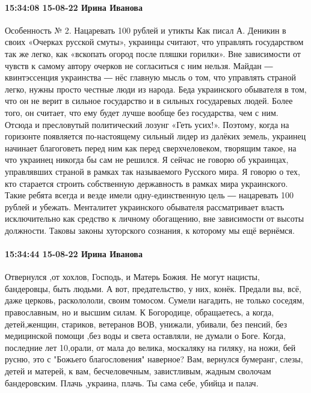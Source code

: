 \paragraph{15:34:08 15-08-22 Ирина Иванова}

Особенность № 2. Нацаревать 100 рублей и утикты Как писал А. Деникин в своих
«Очерках русской смуты», украинцы считают, что управлять государством так же
легко, как «вскопать огород после пляшки горилки». Вне зависимости от чувств к
самому автору очерков не согласиться с ним нельзя. Майдан ― квинтэссенция
украинства ― нёс главную мысль о том, что управлять страной легко, нужны просто
честные люди из народа. Беда украинского обывателя в том, что он не верит в
сильное государство и в сильных государевых людей. Более того, он считает, что
ему будет лучше вообще без государства, чем с ним. Отсюда и пресловутый
политический лозунг «Геть усих!». Поэтому, когда на горизонте появляется
по-настоящему сильный лидер из далёких земель, украинец начинает благоговеть
перед ним как перед сверхчеловеком, творящим такое, на что украинец никогда бы
сам не решился. Я сейчас не говорю об украинцах, управлявших страной в рамках
так называемого Русского мира. Я говорю о тех, кто старается строить
собственную державность в рамках мира украинского. Такие ребята всегда и везде
имели одну-единственную цель ― нацаревать 100 рублей и убежать. Менталитет
украинского обывателя рассматривает власть исключительно как средство к личному
обогащению, вне зависимости от высоты должности. Таковы законы хуторского
сознания, к которому мы ещё вернёмся. 

\paragraph{15:34:44 15-08-22 Ирина Иванова}

Отвернулся ,от хохлов, Господь, и Матерь Божия. Не могут нацисты, бандеровцы,
быть людьми. А вот, предательство, у них, конёк. Предали вы, всё, даже церковь,
расколололи, своим томосом. Сумели нагадить, не только соседям, православным,
но и высшим силам. К Богородице, обращаетесь, а когда, детей,женщин, стариков,
ветеранов ВОВ, унижали, убивали, без пенсий, без медицинской помощи ,без воды и
света оставляли, не думали о Боге. Когда, последние лет 10,орали, от мала до
велика, москаляку на гиляку, на ножи, бей русню, это с "Божьего благословения"
наверное? Вам, вернулся бумеранг, слезы, детей и матерей, к вам, бесчеловечным,
завистливым, жадным сволочам бандеровским. Плачь ,украина, плачь. Ты сама себе,
убийца и палач.

